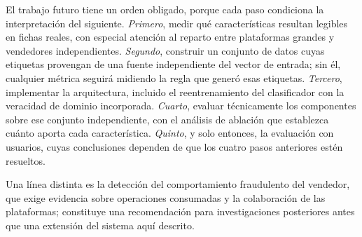 El trabajo futuro tiene un orden obligado, porque cada paso condiciona la interpretación del
siguiente. \emph{Primero}, medir qué características resultan legibles en fichas reales, con
especial atención al reparto entre plataformas grandes y vendedores independientes.
\emph{Segundo}, construir un conjunto de datos cuyas etiquetas provengan de una fuente
independiente del vector de entrada; sin él, cualquier métrica seguirá midiendo la regla que
generó esas etiquetas. \emph{Tercero}, implementar la arquitectura, incluido el reentrenamiento
del clasificador con la veracidad de dominio incorporada. \emph{Cuarto}, evaluar técnicamente
los componentes sobre ese conjunto independiente, con el análisis de ablación que establezca
cuánto aporta cada característica. \emph{Quinto}, y solo entonces, la evaluación con usuarios,
cuyas conclusiones dependen de que los cuatro pasos anteriores estén resueltos.

Una línea distinta es la detección del comportamiento fraudulento del vendedor, que exige
evidencia sobre operaciones consumadas y la colaboración de las plataformas; constituye una
recomendación para investigaciones posteriores antes que una extensión del sistema aquí
descrito.
